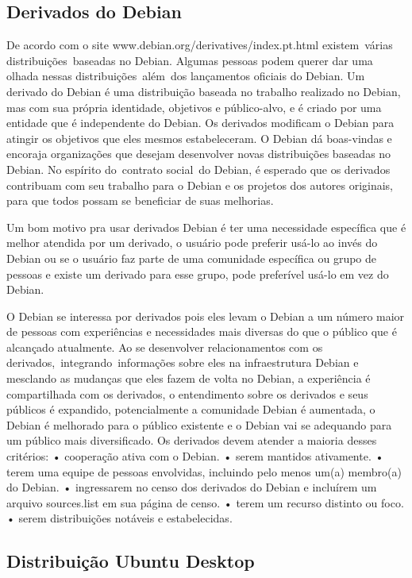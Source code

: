 \subsection{Derivados do Debian}
De acordo com o site www.debian.org/derivatives/index.pt.html existem várias distribuições baseadas no Debian. Algumas pessoas podem querer dar uma olhada nessas distribuições além dos lançamentos oficiais do Debian. Um derivado do Debian é uma distribuição baseada no trabalho realizado no Debian, mas com sua própria identidade, objetivos e público-alvo, e é criado por uma entidade que é independente do Debian. Os derivados modificam o Debian para atingir os objetivos que eles mesmos estabeleceram. O Debian dá boas-vindas e encoraja organizações que desejam desenvolver novas distribuições baseadas no Debian. No espírito do contrato social do Debian, é esperado que os derivados contribuam com seu trabalho para o Debian e os projetos dos autores originais, para que todos possam se beneficiar de suas melhorias.

Um bom motivo pra usar derivados Debian é ter uma necessidade específica que é melhor atendida por um derivado, o usuário pode preferir usá-lo ao invés do Debian ou se o usuário faz parte de uma comunidade específica ou grupo de pessoas e existe um derivado para esse grupo, pode preferível usá-lo em vez do Debian.

O Debian se interessa por derivados pois eles levam o Debian a um número maior de pessoas com experiências e necessidades mais diversas do que o público que é alcançado atualmente. Ao se desenvolver relacionamentos com os derivados, integrando informações sobre eles na infraestrutura Debian e mesclando as mudanças que eles fazem de volta no Debian, a experiência é compartilhada com os derivados, o entendimento sobre os derivados e seus públicos é expandido, potencialmente a comunidade Debian é aumentada, o Debian é melhorado para o público existente e o Debian vai se adequando para um público mais diversificado. Os derivados devem atender a maioria desses critérios:
• cooperação ativa com o Debian.
• serem mantidos ativamente.
• terem uma equipe de pessoas envolvidas, incluindo pelo menos um(a) membro(a) do Debian.
• ingressarem no censo dos derivados do Debian e incluírem um arquivo sources.list em sua página de censo.
• terem um recurso distinto ou foco.
• serem distribuições notáveis e estabelecidas. 

\subsection{Distribuição Ubuntu Desktop}

